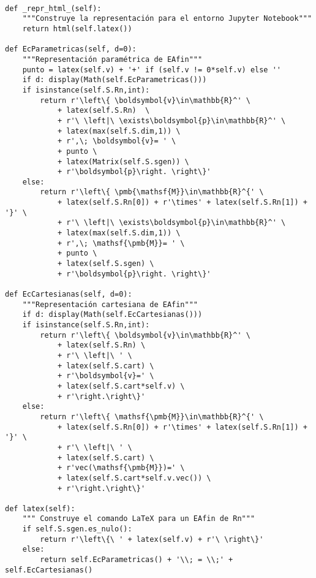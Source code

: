 \documentclass[11pt]{report}
\begin{document}
\begin{verbatim}

def _repr_html_(self):
    """Construye la representación para el entorno Jupyter Notebook"""
    return html(self.latex())

def EcParametricas(self, d=0):
    """Representación paramétrica de EAfin"""
    punto = latex(self.v) + '+' if (self.v != 0*self.v) else ''
    if d: display(Math(self.EcParametricas()))
    if isinstance(self.S.Rn,int):
        return r'\left\{ \boldsymbol{v}\in\mathbb{R}^' \
            + latex(self.S.Rn)  \
            + r'\ \left|\ \exists\boldsymbol{p}\in\mathbb{R}^' \
            + latex(max(self.S.dim,1)) \
            + r',\; \boldsymbol{v}= ' \
            + punto \
            + latex(Matrix(self.S.sgen)) \
            + r'\boldsymbol{p}\right. \right\}' 
    else:
        return r'\left\{ \pmb{\mathsf{M}}\in\mathbb{R}^{' \
            + latex(self.S.Rn[0]) + r'\times' + latex(self.S.Rn[1]) + '}' \
            + r'\ \left|\ \exists\boldsymbol{p}\in\mathbb{R}^' \
            + latex(max(self.S.dim,1)) \
            + r',\; \mathsf{\pmb{M}}= ' \
            + punto \
            + latex(self.S.sgen) \
            + r'\boldsymbol{p}\right. \right\}' 
                    
def EcCartesianas(self, d=0):
    """Representación cartesiana de EAfin"""
    if d: display(Math(self.EcCartesianas()))
    if isinstance(self.S.Rn,int):
        return r'\left\{ \boldsymbol{v}\in\mathbb{R}^' \
            + latex(self.S.Rn) \
            + r'\ \left|\ ' \
            + latex(self.S.cart) \
            + r'\boldsymbol{v}=' \
            + latex(self.S.cart*self.v) \
            + r'\right.\right\}' 
    else:
        return r'\left\{ \mathsf{\pmb{M}}\in\mathbb{R}^{' \
            + latex(self.S.Rn[0]) + r'\times' + latex(self.S.Rn[1]) + '}' \
            + r'\ \left|\ ' \
            + latex(self.S.cart) \
            + r'vec(\mathsf{\pmb{M}})=' \
            + latex(self.S.cart*self.v.vec()) \
            + r'\right.\right\}' 
    
def latex(self):
    """ Construye el comando LaTeX para un EAfin de Rn"""
    if self.S.sgen.es_nulo():
        return r'\left\{\ ' + latex(self.v) + r'\ \right\}'
    else:
        return self.EcParametricas() + '\\; = \\;' + self.EcCartesianas()
        
\end{verbatim}
\end{document}
